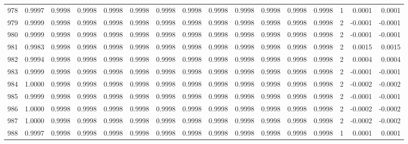 \begin{tabular}{lrrrrrrrrrrrrrrr}
978 &      0.9997 &  0.9998 &  0.9998 &  0.9998 &  0.9998 &  0.9998 &  0.9998 &  0.9998 &  0.9998 &  0.9998 &   0.9998 &     0.9998 &      1 &                    0.0001 &                     0.0001 \\
979 &      0.9999 &  0.9998 &  0.9998 &  0.9998 &  0.9998 &  0.9998 &  0.9998 &  0.9998 &  0.9998 &  0.9998 &   0.9998 &     0.9998 &      2 &                   -0.0001 &                    -0.0001 \\
980 &      0.9999 &  0.9998 &  0.9998 &  0.9998 &  0.9998 &  0.9998 &  0.9998 &  0.9998 &  0.9998 &  0.9998 &   0.9998 &     0.9998 &      2 &                   -0.0001 &                    -0.0001 \\
981 &      0.9983 &  0.9998 &  0.9998 &  0.9998 &  0.9998 &  0.9998 &  0.9998 &  0.9998 &  0.9998 &  0.9998 &   0.9998 &     0.9998 &      2 &                    0.0015 &                     0.0015 \\
982 &      0.9994 &  0.9998 &  0.9998 &  0.9998 &  0.9998 &  0.9998 &  0.9998 &  0.9998 &  0.9998 &  0.9998 &   0.9998 &     0.9998 &      2 &                    0.0004 &                     0.0004 \\
983 &      0.9999 &  0.9998 &  0.9998 &  0.9998 &  0.9998 &  0.9998 &  0.9998 &  0.9998 &  0.9998 &  0.9998 &   0.9998 &     0.9998 &      2 &                   -0.0001 &                    -0.0001 \\
984 &      1.0000 &  0.9998 &  0.9998 &  0.9998 &  0.9998 &  0.9998 &  0.9998 &  0.9998 &  0.9998 &  0.9998 &   0.9998 &     0.9998 &      2 &                   -0.0002 &                    -0.0002 \\
985 &      0.9999 &  0.9998 &  0.9998 &  0.9998 &  0.9998 &  0.9998 &  0.9998 &  0.9998 &  0.9998 &  0.9998 &   0.9998 &     0.9998 &      2 &                   -0.0001 &                    -0.0001 \\
986 &      1.0000 &  0.9998 &  0.9998 &  0.9998 &  0.9998 &  0.9998 &  0.9998 &  0.9998 &  0.9998 &  0.9998 &   0.9998 &     0.9998 &      2 &                   -0.0002 &                    -0.0002 \\
987 &      1.0000 &  0.9998 &  0.9998 &  0.9998 &  0.9998 &  0.9998 &  0.9998 &  0.9998 &  0.9998 &  0.9998 &   0.9998 &     0.9998 &      2 &                   -0.0002 &                    -0.0002 \\
988 &      0.9997 &  0.9998 &  0.9998 &  0.9998 &  0.9998 &  0.9998 &  0.9998 &  0.9998 &  0.9998 &  0.9998 &   0.9998 &     0.9998 &      1 &                    0.0001 &                     0.0001 \\

\end{tabular}
